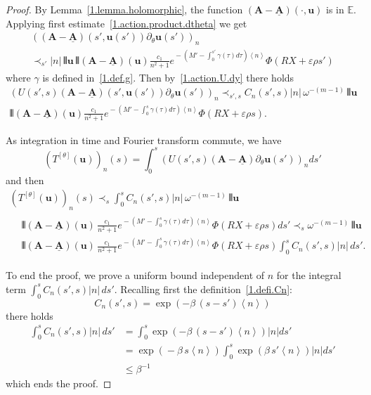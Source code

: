 \documentclass[AHL,Unicode,longabstracts,published]{cedram}
\theoremstyle{plain}
\newcommand*\e{\varepsilon}
\newcommand{\dptl}{\partial}%
\newcommand*\EE{{\mathbb E}}
\newcommand*\g{\gamma}
\newcommand{\ubf}{{\mathbf u}}
\newcommand*\A{{\mathbf A}}
\newcommand*\dsp{\displaystyle}
\newcommand*\und{\underline}
\DeclarePairedDelimiter{\VERT}{|\mkern -1.6mu|\mkern -1.6mu|}{|\mkern -1.6mu|\mkern -1.6mu|}
\begin{document}
\begin{proof}
By Lemma~\ref{1.lemma.holomorphic}, the function $(\A - \und{\A})(\cdot,\ubf)$ is in $\EE$. Applying first estimate~\eqref{1.action.product.dtheta} we get
\begin{multline*}
\left((\A - \und{\A})(s',\ubf(s')) \dptl_{\theta}\ubf(s')\right)_n \\
\prec_{s'} |n| \,\VERT{\ubf}\, \VERT
{({\mathbf A} - \und{{\mathbf A}})(\ubf)}
\frac{\dsp c_1}{\dsp n^2+1} e^{{}- (M' - \int_{0}^{s'}\g(\tau) d\tau) \left<n\right>} \Phi\left(R X+\e\rho s'\right)
\end{multline*}
where $\g$ is defined in~\eqref{1.def.g}. Then by~\eqref{1.action.U.dy} there holds
\begin{multline*}
\left(U(s',s) (\A - \und{\A})(s',\ubf(s')) \dptl_{\theta}\ubf(s') \right)_n \prec_{s',s} C_n(s',s) |n| \,\omega^{-(m-1)}\,\VERT{\ubf}\\
\VERT{({\mathbf A} - \und{{\mathbf A}})(\ubf)} \frac{\dsp c_1}{\dsp n^2+1}e^{{}- (M' - \int_{0}^{s}\g(\tau) d\tau) \left<n\right>} \Phi\left(R X+\e\rho s\right).
\end{multline*}


As integration in time and Fourier transform commute, we have
\[
\left(T^{[\theta]}(\ubf)\right)_n(s) = \int_{0}^{s} \left(U(s',s) (\A - \und{\A}) \dptl_{\theta}\ubf(s') \right)_n ds'
\]
and then
\begin{multline*}
\left(T^{[\theta]}(\ubf)\right)_n(s)
\prec_{s} \int_{0}^{s} C_n(s',s) |n| \,\omega^{-(m-1)}\,\VERT{\ubf} \\
\begin{aligned}
&\VERT{({\mathbf A} - \und{{\mathbf A}})(\ubf)} \,\frac{\dsp c_1}{\dsp n^2+1} e^{{}- (M'- \int_{0}^{s}\g(\tau) d\tau) \left<n\right>} \Phi\left(R X+\e\rho s\right) ds'\prec_{s} \omega^{-(m-1)}\,\VERT{\ubf}\\
& \VERT{({\mathbf A} - \und{{\mathbf A}})(\ubf)} \,\frac{\dsp c_1}{\dsp n^2+1}e^{{}- (M'- \int_{0}^{s}\g(\tau) d\tau) \left<n\right>} \Phi\left(R X+\e\rho s\right) \int_{0}^{s} C_n(s',s) |n| \, ds'.
\end{aligned}
\end{multline*}

To end the proof, we prove a uniform bound independent of $n$ for the integral term $ \int_{0}^{s} C_n(s',s) |n| \, ds'$. Recalling first the definition~\eqref{1.defi.Cn}:
\[
C_n(s',s) = \exp\left(- \beta\, (s-s') \left<n\right> \right)
\]
there holds
\begin{align*}
\int_{0}^{s} C_n(s',s) |n| \, ds' & = \int_{0}^{s} \exp\left(- \beta\, (s-s') \left<n\right> \right) |n| ds' \\
& = \exp\left({} - \beta\, s\left<n\right> \right) \int_{0}^{s} \exp\left(\beta\, s' \left<n\right> \right) |n| ds' \\
& \leq \beta^{-1}
\end{align*}
which ends the proof.
\end{proof}
\end{document}
